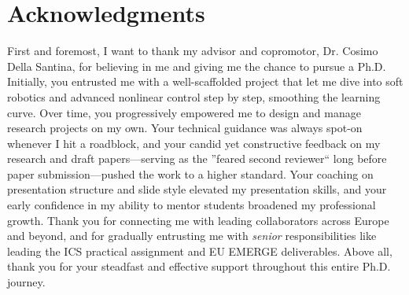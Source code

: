 \chapter*{Acknowledgments}

First and foremost, I want to thank my advisor and copromotor, Dr. Cosimo Della Santina, for believing in me and giving me the chance to pursue a Ph.D. Initially, you entrusted me with a well-scaffolded project that let me dive into soft robotics and advanced nonlinear control step by step, smoothing the learning curve. Over time, you progressively empowered me to design and manage research projects on my own. Your technical guidance was always spot-on whenever I hit a roadblock, and your candid yet constructive feedback on my research and draft papers—serving as the ''feared second reviewer`` long before paper submission—pushed the work to a higher standard. Your coaching on presentation structure and slide style elevated my presentation skills, and your early confidence in my ability to mentor students broadened my professional growth. Thank you for connecting me with leading collaborators across Europe and beyond, and for gradually entrusting me with \emph{senior} responsibilities like leading the ICS practical assignment and EU EMERGE deliverables. Above all, thank you for your steadfast and effective support throughout this entire Ph.D. journey.

